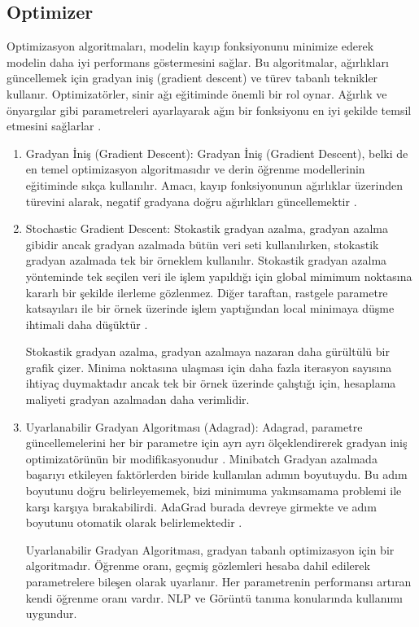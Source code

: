 \documentclass[12pt, a4paper]{article}
\begin{document}
			\subsection{Optimizer} 	
			Optimizasyon algoritmaları, modelin kayıp fonksiyonunu minimize ederek modelin daha iyi performans göstermesini sağlar. Bu algoritmalar, ağırlıkları güncellemek için gradyan iniş (gradient descent) ve türev tabanlı teknikler kullanır.
			Optimizatörler, sinir ağı eğitiminde önemli bir rol oynar. Ağırlık ve önyargılar gibi parametreleri ayarlayarak ağın bir fonksiyonu en iyi şekilde temsil etmesini sağlarlar \cite{deep_learning}. 
			\begin{enumerate}
				\item 	Gradyan İniş (Gradient Descent):
				Gradyan İniş (Gradient Descent), belki de en temel optimizasyon algoritmasıdır ve derin öğrenme modellerinin eğitiminde sıkça kullanılır. Amacı, kayıp fonksiyonunun ağırlıklar üzerinden türevini alarak, negatif gradyana doğru ağırlıkları güncellemektir \cite{sgd}.
				
				
				\item	Stochastic Gradient Descent:
				Stokastik gradyan azalma, gradyan azalma gibidir ancak gradyan azalmada bütün veri seti kullanılırken, stokastik gradyan azalmada tek bir örneklem kullanılır. Stokastik gradyan azalma yönteminde tek seçilen veri ile işlem yapıldığı için global mimimum noktasına kararlı bir şekilde ilerleme gözlenmez. Diğer taraftan, rastgele parametre katsayıları ile bir örnek üzerinde işlem yaptığından local minimaya düşme ihtimali daha düşüktür \cite{sgd}.
				
				Stokastik gradyan azalma, gradyan azalmaya nazaran daha gürültülü bir grafik çizer. Minima noktasına ulaşması için daha fazla iterasyon sayısına ihtiyaç duymaktadır ancak tek bir örnek üzerinde çalıştığı için, hesaplama maliyeti gradyan azalmadan daha verimlidir.
				
				
				\item 	Uyarlanabilir Gradyan Algoritması (Adagrad):
				Adagrad, parametre güncellemelerini her bir parametre için ayrı ayrı ölçeklendirerek gradyan iniş optimizatörünün bir modifikasyonudur .
				Minibatch Gradyan azalmada başarıyı etkileyen faktörlerden biride kullanılan adımın boyutuydu. Bu adım boyutunu doğru belirleyememek, bizi minimuma yakınsamama problemi ile karşı karşıya bırakabilirdi. AdaGrad burada devreye girmekte ve adım boyutunu otomatik olarak belirlemektedir \cite{sgd}.
				
				Uyarlanabilir Gradyan Algoritması, gradyan tabanlı optimizasyon için bir algoritmadır. Öğrenme oranı, geçmiş gözlemleri hesaba dahil edilerek parametrelere bileşen olarak uyarlanır. Her parametrenin performansı artıran kendi öğrenme oranı vardır. NLP ve Görüntü tanıma konularında kullanımı uygundur.
				

\end{enumerate}
\end{document}
